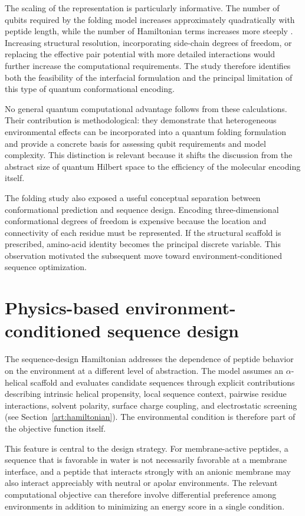 The scaling of the representation is particularly informative. The number of qubits required by the folding model increases approximately quadratically with peptide length, while the number of Hamiltonian terms increases more steeply \cite{DANI_CUANTICA}. Increasing structural resolution, incorporating side-chain degrees of freedom, or replacing the effective pair potential with more detailed interactions would further increase the computational requirements. The study therefore identifies both the feasibility of the interfacial formulation and the principal limitation of this type of quantum conformational encoding.

No general quantum computational advantage follows from these calculations. Their contribution is methodological: they demonstrate that heterogeneous environmental effects can be incorporated into a quantum folding formulation and provide a concrete basis for assessing qubit requirements and model complexity. This distinction is relevant because it shifts the discussion from the abstract size of quantum Hilbert space to the efficiency of the molecular encoding itself.

The folding study also exposed a useful conceptual separation between conformational prediction and sequence design. Encoding three-dimensional conformational degrees of freedom is expensive because the location and connectivity of each residue must be represented. If the structural scaffold is prescribed, amino-acid identity becomes the principal discrete variable. This observation motivated the subsequent move toward environment-conditioned sequence optimization.


\section{Physics-based environment-conditioned sequence design}


The sequence-design Hamiltonian addresses the dependence of peptide behavior on the environment at a different level of abstraction. The model assumes an $\alpha$-helical scaffold and evaluates candidate sequences through explicit contributions describing intrinsic helical propensity, local sequence context, pairwise residue interactions, solvent polarity, surface charge coupling, and electrostatic screening \cite{DANI_HAMILTONIAN} (see Section~\ref{art:hamiltonian}). The environmental condition is therefore part of the objective function itself.

This feature is central to the design strategy. For membrane-active peptides, a sequence that is favorable in water is not necessarily favorable at a membrane interface, and a peptide that interacts strongly with an anionic membrane may also interact appreciably with neutral or apolar environments. The relevant computational objective can therefore involve differential preference among environments in addition to minimizing an energy score in a single condition.

